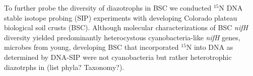 To further probe the diversity of diazotrophs in BSC we conducted $^{15}$N DNA stable isotope probing (SIP) experiments with developing Colorado plateau biological soil crusts (BSC). Although molecular characterizations of BSC \textit{nifH} diversity yielded predominantly heterocystous cyanobacteria-like \textit{nifH} genes, microbes from young, developing BSC that incorporated $^{15}$N into DNA as determined by DNA-SIP were not cyanobacteria but rather heterotrophic diazotrphs in (list phyla? Taxonomy?).


